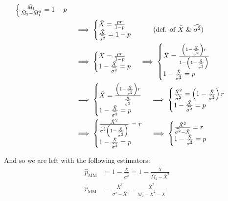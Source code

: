 \documentclass{article}
\begin{document}
\begin{align*}
\begin{cases}
        \frac{\bar M_1}{\bar M_2-\bar M_1^2}=1-p
    \end{cases}\\
    &\implies
    \begin{cases}
        \bar X=\frac{pr}{1-p}\\
        \frac{\bar X}{\widehat{\sigma^2}}=1-p
    \end{cases}\tag{def. of $\bar X$ \& $\widehat{\sigma^2}$}\\
    &\implies
    \begin{cases}
        \bar X=\frac{pr}{1-p}\\
        1-\frac{\bar X}{\widehat{\sigma^2}}=p
    \end{cases}
    \implies
    \begin{cases}
        \bar X=\frac{\left(1-\frac{\bar X}{\widehat{\sigma^2}}\right)r}{1-\left(1-\frac{\bar X}{\widehat{\sigma^2}}\right)}\\
        1-\frac{\bar X}{\widehat{\sigma^2}}=p
    \end{cases}\\
    &\implies
    \begin{cases}
        \bar X=\frac{\left(1-\frac{\bar X}{\widehat{\sigma^2}}\right)r}{\frac{\bar X}{\widehat{\sigma^2}}}\\
        1-\frac{\bar X}{\widehat{\sigma^2}}=p
    \end{cases}
    \implies
    \begin{cases}
        \frac{\bar X^2}{\widehat{\sigma^2}}=\left(1-\frac{\bar X}{\widehat{\sigma^2}}\right)r\\
        1-\frac{\bar X}{\widehat{\sigma^2}}=p
    \end{cases}\\
    &\implies
    \begin{cases}
        \frac{\bar X^2}{\widehat{\sigma^2}\left(1-\frac{\bar X}{\widehat{\sigma^2}}\right)}=r\\
        1-\frac{\bar X}{\widehat{\sigma^2}}=p
    \end{cases}
    \implies
    \begin{cases}
        \frac{\bar X^2}{\widehat{\sigma^2}-\bar X}=r\\
        1-\frac{\bar X}{\widehat{\sigma^2}}=p
    \end{cases}
\end{align*}

And so we are left with the following estimators:
\begin{align*}
    \hat{p}_{\text{MM}}&=1-\frac{\bar X}{\widehat{\sigma^2}}=1-\frac{\bar X}{\bar M_2-\bar X^2}\\
    \hat{r}_{\text{MM}}&=\frac{\bar X^2}{\widehat{\sigma^2}-\bar X}=\frac{\bar X^2}{\bar M_2-\bar X^2-\bar X}
\end{align*}
\smallskip
\end{document}
